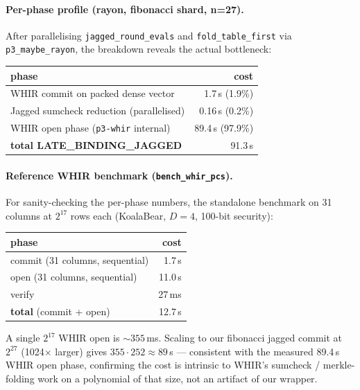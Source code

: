 \paragraph{Per-phase profile (rayon, fibonacci shard, n=27).}
After parallelising \texttt{jagged\_round\_evals} and
\texttt{fold\_table\_first} via \texttt{p3\_maybe\_rayon}, the
breakdown reveals the actual bottleneck:

\begin{tabular}{lr}
\toprule
\textbf{phase}                              & \textbf{cost} \\
\midrule
WHIR commit on packed dense vector          & 1.7\,s    (1.9\%) \\
Jagged sumcheck reduction (parallelised)    & 0.16\,s  (0.2\%) \\
WHIR open phase (\texttt{p3-whir} internal) & 89.4\,s  (97.9\%) \\
\midrule
\textbf{total LATE\_BINDING\_JAGGED}        & 91.3\,s \\
\bottomrule
\end{tabular}

\paragraph{Reference WHIR benchmark (\texttt{bench\_whir\_pcs}).}
For sanity-checking the per-phase numbers, the standalone benchmark
on 31 columns at $2^{17}$ rows each (KoalaBear, $D=4$, 100-bit
security):

\begin{tabular}{lr}
\toprule
\textbf{phase}                                 & \textbf{cost} \\
\midrule
commit (31 columns, sequential)                & 1.7\,s \\
open   (31 columns, sequential)                & 11.0\,s \\
verify                                         & 27\,ms \\
\midrule
\textbf{total} (commit + open)                 & 12.7\,s \\
\bottomrule
\end{tabular}

A single $2^{17}$ WHIR open is $\sim 355$\,ms.  Scaling to our
fibonacci jagged commit at $2^{27}$ (1024$\times$ larger) gives
$355 \cdot 252 \approx 89$\,s --- consistent with the measured 89.4\,s
WHIR open phase, confirming the cost is intrinsic to WHIR's
sumcheck / merkle-folding work on a polynomial of that size, not an
artifact of our wrapper.


